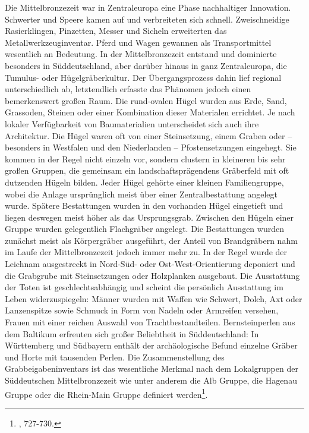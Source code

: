 \documentclass[openany,twoside,twocolumn]{book}
\let\rmarkdownfootnote\footnote%
\def\footnote{\protect\rmarkdownfootnote}
\begin{document}
Die Mittelbronzezeit war in Zentraleuropa eine Phase nachhaltiger
Innovation. Schwerter und Speere kamen auf und verbreiteten sich
schnell. Zweischneidige Rasierklingen, Pinzetten, Messer und Sicheln
erweiterten das Metallwerkzeuginventar. Pferd und Wagen gewannen als
Transportmittel wesentlich an Bedeutung. In der Mittelbronzezeit
entstand und dominierte besonders in Süddeutschland, aber darüber hinaus
in ganz Zentraleuropa, die Tumulus- oder Hügelgräberkultur. Der
Übergangsprozess dahin lief regional unterschiedlich ab, letztendlich
erfasste das Phänomen jedoch einen bemerkenswert großen Raum. Die
rund-ovalen Hügel wurden aus Erde, Sand, Grassoden, Steinen oder einer
Kombination dieser Materialen errichtet. Je nach lokaler Verfügbarkeit
von Baumaterialien unterscheidet sich auch ihre Architektur. Die Hügel
waren oft von einer Steinsetzung, einem Graben oder -- besonders in
Westfalen und den Niederlanden -- Pfostensetzungen eingehegt. Sie kommen
in der Regel nicht einzeln vor, sondern clustern in kleineren bis sehr
großen Gruppen, die gemeinsam ein landschaftsprägendens Gräberfeld mit
oft dutzenden Hügeln bilden. Jeder Hügel gehörte einer kleinen
Familiengruppe, wobei die Anlage ursprünglich meist über einer
Zentralbestattung angelegt wurde. Spätere Bestattungen wurden in den
vorhanden Hügel eingetieft und liegen deswegen meist höher als das
Ursprungsgrab. Zwischen den Hügeln einer Gruppe wurden gelegentlich
Flachgräber angelegt. Die Bestattungen wurden zunächst meist als
Körpergräber ausgeführt, der Anteil von Brandgräbern nahm im Laufe der
Mittelbronzezeit jedoch immer mehr zu. In der Regel wurde der Leichnam
ausgestreckt in Nord-Süd- oder Ost-West-Orientierung deponiert und die
Grabgrube mit Steinsetzungen oder Holzplanken ausgebaut. Die Ausstattung
der Toten ist geschlechtsabhängig und scheint die persönlich Ausstattung
im Leben widerzuspiegeln: Männer wurden mit Waffen wie Schwert, Dolch,
Axt oder Lanzenspitze sowie Schmuck in Form von Nadeln oder Armreifen
versehen, Frauen mit einer reichen Auswahl von Trachtbestandteilen.
Bernsteinperlen aus dem Baltikum erfreuten sich großer Beliebtheit in
Süddeutschland: In Württemberg und Südbayern enthält der archäologische
Befund einzelne Gräber und Horte mit tausenden Perlen. Die
Zusammenstellung des Grabbeigabeninventars ist das wesentliche Merkmal
nach dem Lokalgruppen der Süddeutschen Mittelbronzezeit wie unter
anderem die Alb Gruppe, die Hagenau Gruppe oder die Rhein-Main Gruppe
definiert werden\footnote{\textcite{jockenhovel_germany_2013}, 727-730.}.
\end{document}
